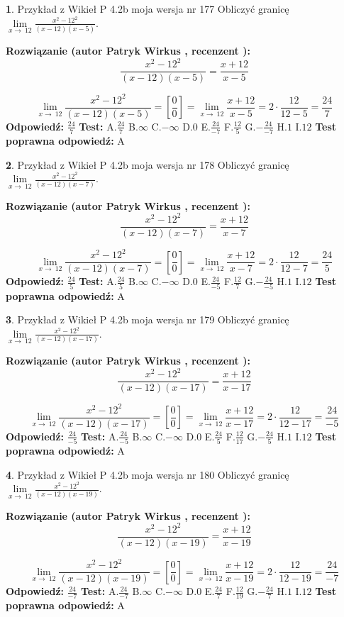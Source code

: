 \documentclass[12pt, a4paper]{article}
\theoremstyle{definition} %
\newtheorem{zad}{}
\newcommand{\zadStart}[1]{\begin{zad}#1\newline}
\newcommand{\zadStop}{\end{zad}}
\newcommand{\rozwStart}[2]{\noindent \textbf{Rozwiązanie (autor #1 , recenzent #2): }\newline}
\newcommand{\rozwStop}{\newline}
\newcommand{\odpStart}{\noindent \textbf{Odpowiedź:}\newline}
\newcommand{\odpStop}{\newline}
\newcommand{\testStart}{\noindent \textbf{Test:}\newline}
\newcommand{\testStop}{\newline}
\newcommand{\kluczStart}{\noindent \textbf{Test poprawna odpowiedź:}\newline}
\newcommand{\kluczStop}{\newline}
\begin{document}
\zadStart{Przykład z Wikieł P 4.2b moja wersja nr 177}
Obliczyć granicę $\lim\limits_{x\to\ 12}\frac{x^{2}-12^{2}}{(x-12)(x-5)}$.
\zadStop
\rozwStart{Patryk Wirkus}{}
$$\frac{x^{2}-12^{2}}{(x-12)(x-5)}=\frac{x+12}{x-5}$$

$$\lim\limits_{x\to\ 12}\frac{x^{2}-12^{2}}{(x-12)(x-5)}=[\frac{0}{0}]=\lim\limits_{x\to\ 12}\frac{x+12}{x-5}=2 \cdot \frac{12}{12-5} = \frac{24}{7}$$
\rozwStop
\odpStart
$\frac{24}{7}$
\odpStop
\testStart
A.$\frac{24}{7}$
B.$\infty$
C.$-\infty$
D.$0$
E.$\frac{24}{-7}$
F.$\frac{12}{5}$
G.$-\frac{24}{-7}$
H.$1$
I.$12$
\testStop
\kluczStart
A
\kluczStop



\zadStart{Przykład z Wikieł P 4.2b moja wersja nr 178}
Obliczyć granicę $\lim\limits_{x\to\ 12}\frac{x^{2}-12^{2}}{(x-12)(x-7)}$.
\zadStop
\rozwStart{Patryk Wirkus}{}
$$\frac{x^{2}-12^{2}}{(x-12)(x-7)}=\frac{x+12}{x-7}$$

$$\lim\limits_{x\to\ 12}\frac{x^{2}-12^{2}}{(x-12)(x-7)}=[\frac{0}{0}]=\lim\limits_{x\to\ 12}\frac{x+12}{x-7}=2 \cdot \frac{12}{12-7} = \frac{24}{5}$$
\rozwStop
\odpStart
$\frac{24}{5}$
\odpStop
\testStart
A.$\frac{24}{5}$
B.$\infty$
C.$-\infty$
D.$0$
E.$\frac{24}{-5}$
F.$\frac{12}{7}$
G.$-\frac{24}{-5}$
H.$1$
I.$12$
\testStop
\kluczStart
A
\kluczStop



\zadStart{Przykład z Wikieł P 4.2b moja wersja nr 179}
Obliczyć granicę $\lim\limits_{x\to\ 12}\frac{x^{2}-12^{2}}{(x-12)(x-17)}$.
\zadStop
\rozwStart{Patryk Wirkus}{}
$$\frac{x^{2}-12^{2}}{(x-12)(x-17)}=\frac{x+12}{x-17}$$

$$\lim\limits_{x\to\ 12}\frac{x^{2}-12^{2}}{(x-12)(x-17)}=[\frac{0}{0}]=\lim\limits_{x\to\ 12}\frac{x+12}{x-17}=2 \cdot \frac{12}{12-17} = \frac{24}{-5}$$
\rozwStop
\odpStart
$\frac{24}{-5}$
\odpStop
\testStart
A.$\frac{24}{-5}$
B.$\infty$
C.$-\infty$
D.$0$
E.$\frac{24}{5}$
F.$\frac{12}{17}$
G.$-\frac{24}{5}$
H.$1$
I.$12$
\testStop
\kluczStart
A
\kluczStop



\zadStart{Przykład z Wikieł P 4.2b moja wersja nr 180}
Obliczyć granicę $\lim\limits_{x\to\ 12}\frac{x^{2}-12^{2}}{(x-12)(x-19)}$.
\zadStop
\rozwStart{Patryk Wirkus}{}
$$\frac{x^{2}-12^{2}}{(x-12)(x-19)}=\frac{x+12}{x-19}$$

$$\lim\limits_{x\to\ 12}\frac{x^{2}-12^{2}}{(x-12)(x-19)}=[\frac{0}{0}]=\lim\limits_{x\to\ 12}\frac{x+12}{x-19}=2 \cdot \frac{12}{12-19} = \frac{24}{-7}$$
\rozwStop
\odpStart
$\frac{24}{-7}$
\odpStop
\testStart
A.$\frac{24}{-7}$
B.$\infty$
C.$-\infty$
D.$0$
E.$\frac{24}{7}$
F.$\frac{12}{19}$
G.$-\frac{24}{7}$
H.$1$
I.$12$
\testStop
\kluczStart
A
\kluczStop
\end{document}
